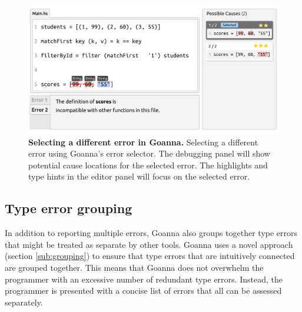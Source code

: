 \documentclass[pdflatex,sn-mathphys-num]{sn-jnl}%
\begin{document}
    \begin{figure}[ht!]
        \centering
        \includegraphics[width=\linewidth]{images/goanna-multi-error}
        \caption[Selecting a different error in Goanna]{\textbf{Selecting a different error in Goanna.} Selecting a different error using Goanna's error selector. The debugging panel will show potential cause locations for the selected error. The highlights and type hints in the editor panel will focus on the selected error.}
        \label{fig:multi-error}
    \end{figure}



    \subsection{Type error grouping}  \label{sub:group}
    In addition to reporting multiple errors, Goanna also groups together type errors that might be treated as separate by other tools. Goanna uses a novel approach (section \ref{sub:grouping}) to ensure that type errors that are intuitively connected are grouped together. This means that Goanna does not overwhelm the programmer with an excessive number of redundant type errors. Instead, the programmer is presented with a concise list of errors that all can be assessed separately.
\end{document}

